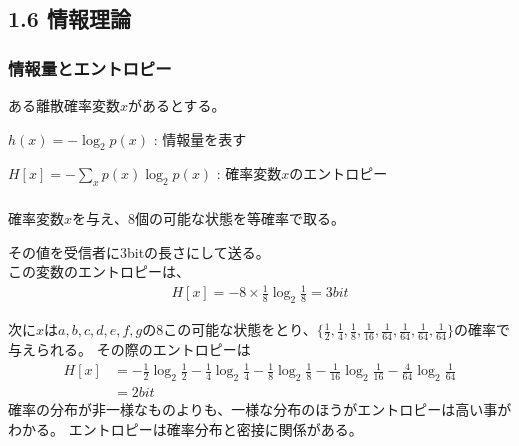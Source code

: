 \documentclass[dvipdfmx]{beamer}
\theoremstyle{definition}
\begin{document}
\subsection{1.6 情報理論}
\begin{frame}
  \frametitle{情報量とエントロピー}
  ある離散確率変数$x$があるとする。

  $h(x) = -\log_{2}p(x)$ : 情報量を表す
  
  $H[x] = - \sum_{x} p(x)\log_{2}p(x)$ : 確率変数$x$のエントロピー
\end{frame}

\begin{frame}
  \frametitle{}
  確率変数$x$を与え、8個の可能な状態を等確率で取る。
  
  その値を受信者に3bitの長さにして送る。\\この変数のエントロピーは、
  \begin{gather*}
    H[x] = -8 \times \frac{1}{8}\log_{2}\frac{1}{8}=3bit
  \end{gather*}

  次に$x$は${a,b,c,d,e,f,g}$の8この可能な状態をとり、$\{\frac{1}{2},\frac{1}{4},\frac{1}{8},\frac{1}{16},\frac{1}{64},\frac{1}{64},\frac{1}{64},\frac{1}{64} \}$の確率で与えられる。
  その際のエントロピーは
  \begin{align*}
    H[x] &= -\frac{1}{2} \log_{2} \frac{1}{2} -\frac{1}{4}\log_{2}\frac{1}{4} -\frac{1}{8}\log_{2}\frac{1}{8} -\frac{1}{16}\log_{2}\frac{1}{16} -\frac{4}{64}\log_{2}\frac{1}{64} \\
         &= 2bit
  \end{align*}
  確率の分布が非一様なものよりも、一様な分布のほうがエントロピーは高い事がわかる。
  エントロピーは確率分布と密接に関係がある。
\end{frame}
\end{document}
